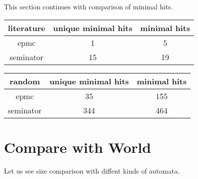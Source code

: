 \documentclass[
	digital
nolof, nolot
]{fithesis3}
\begin{document}
This section continues with comparison of minimal hits.

\begin{center}
	\begin{tabular}{ |c|c|c| } 
		\hline
		literature&unique minimal hits&minimal hits\\
		\hline
		epmc&1 & 5\\
		\hline
		seminator &15 & 19\\ 
		\hline
	\end{tabular}
\end{center}
		\begin{center}
			\begin{tabular}{ |c|c|c| } 
				\hline
				random&unique minimal hits&minimal hits\\
				\hline
				epmc&35 & 155\\
				\hline
				seminator &344 & 464\\ 
				\hline
			\end{tabular}
		\end{center}
		
		

	
		\section{Compare with World}
		Let us see size comparison with diffent kinds of automata.
		
\end{document}
